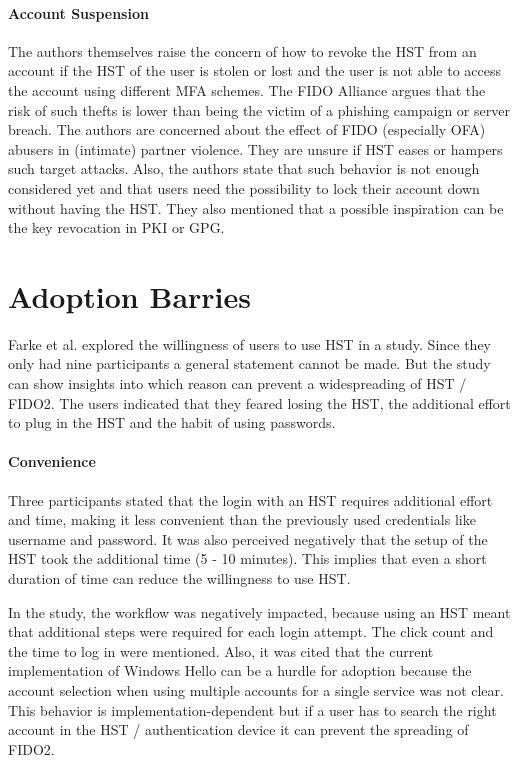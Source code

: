 \documentclass[runningheads]{llncs}
\begin{document}
\paragraph{Account Suspension}
The authors themselves raise the concern of how to revoke the HST from an account if the HST of the user is stolen or lost and the user is not able to access the account using different MFA schemes. The FIDO Alliance argues that the risk of such thefts is lower than being the victim of a phishing campaign or server breach. The authors are concerned about the effect of FIDO (especially OFA) abusers in (intimate) partner violence. They are unsure if HST eases or hampers such target attacks. Also, the authors state that such behavior is not enough considered yet and that users need the possibility to lock their account down without having the HST. They also mentioned that a possible inspiration can be the key revocation in PKI or GPG.

\section{Adoption Barries}
Farke et al. explored the willingness of users to use HST in a study. Since they only had nine participants a general statement cannot be made. But the study can show insights into which reason can prevent a widespreading of HST / FIDO2. The users indicated that they feared losing the HST, the additional effort to plug in the HST and the habit of using passwords.

\paragraph{Convenience}
Three participants stated that the login with an HST requires additional effort and time, making it less convenient than the previously used credentials like username and password. It was also perceived negatively that the setup of the HST took the additional time (5 - 10 minutes). This implies that even a short duration of time can reduce the willingness to use HST.

In the study, the workflow was negatively impacted, because using an HST meant that additional steps were required for each login attempt. The click count and the time to log in were mentioned. Also, it was cited that the current implementation of Windows Hello can be a hurdle for adoption because the account selection when using multiple accounts for a single service was not clear. This behavior is implementation-dependent but if a user has to search the right account in the HST / authentication device it can prevent the spreading of FIDO2. 
\end{document}
